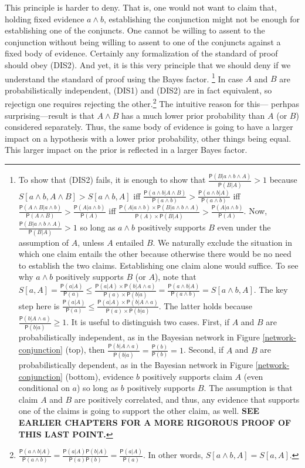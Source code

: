 \documentclass[10pt,dvipsnames,enabledeprecatedfontcommands]{scrartcl}
\newcommand{\pr}[1]{\mathsf{P}(#1)}
\begin{document}
\noindent This principle is harder to deny. That is, one would not want
to claim that, holding fixed evidence \(a\wedge b\), establishing the
conjunction might not be enough for establishing one of the conjuncts.
One cannot be willing to assent to the conjunction without being willing
to assent to one of the conjuncts against a fixed body of evidence.
Certainly any formalization of the standard of proof should obey (DIS2).
And yet, it is this very principle that we should deny if we understand
the standard of proof using the Bayes factor.
\footnote{To show that (DIS2) fails, it is enough to show that $\frac{\pr{B \vert a\wedge b \wedge A}}{\pr{B \vert A}}>1$ because $S[a\wedge b, A\wedge B]>S[a\wedge b, A]$ iff $\frac{\pr{a\wedge b \vert A \wedge B}}{\pr{a\wedge b}}>\frac{\pr{a\wedge b \vert A}}{\pr{a\wedge b}}$ iff $\frac{\pr{A\wedge B \vert a \wedge b}}{\pr{A\wedge B}}>\frac{\pr{A \vert a \wedge b }}{\pr{A}}$ iff $\frac{\pr{A \vert a \wedge b} \times \pr{B \vert a\wedge b\wedge A}}{\pr{A} \times \pr{B \vert A}}>\frac{\pr{A \vert a \wedge b }}{\pr{A}}$. Now, $\frac{\pr{B \vert a\wedge b \wedge A}}{\pr{B \vert A}}>1$ so long as $a\wedge b$ positively supports $B$ even under the assumption of $A$, unless $A$ entailed $B$. We naturally exclude the situation in which one claim entails the other because otherwise there would be no need to establish the two claims. Establishing one claim alone would suffice. To see why $a\wedge b$ positively supports $B$ (or $A$), note that $S[a, A]=\frac{\pr{a |A}}{\pr{a}} \leq \frac{\pr{a |A} \times \pr{b | A \wedge a}}{\pr{a}\times \pr{b | a}}=\frac{\pr{a \wedge b |A}}{\pr{a\wedge b}}=S[a \wedge b, A]$. The key step here is $\frac{\pr{a |A}}{\pr{a}} \leq \frac{\pr{a |A} \times \pr{b | A \wedge a}}{\pr{a}\times \pr{b | a}}$. The latter holds because $\frac{\pr{b | A \wedge a}}{\pr{b | a}}\geq 1$. It is useful to distinguish two cases. First, if $A$ and $B$ are probabilistically independent, as in the Bayesian network in Figure \ref{network-conjunction} (top), then $\frac{\pr{b | A \wedge a}}{\pr{b | a}}= \frac{\pr{b}}{\pr{b}} = 1$. Second, if $A$ and $B$ are probabilistically dependent, as in the Bayesian network in Figure \ref{network-conjunction} (bottom), evidence $b$ positively supports claim $A$ (even conditional on $a$) so long as $b$ positively supports $B$. The assumption is that claim $A$ and $B$ are positively correlated, and thus, any evidence that supports one of the claims is going to support the other claim, as well. \textbf{SEE EARLIER CHAPTERS FOR A MORE RIGOROUS PROOF OF THIS LAST POINT.}}
In case \(A\) and \(B\) are probabilistically independent, (DIS1) and
(DIS2) are in fact equivalent, so rejectign one requires rejecting the
other.\footnote{$\frac{\pr{a\wedge b \vert A}}{\pr{a\wedge b}}=\frac{\pr{a \vert A}\pr{b \vert A}}{\pr{a}\pr{b}}=\frac{\pr{a \vert A}}{\pr{a}}$. In other words, $S[a \wedge b, A]=S[a, A]$.}
The intuitive reason for this--- perhpas surprising---result is that
\(A \wedge B\) has a much lower prior probability than \(A\) (or \(B\))
considered separately. Thus, the same body of evidence is going to have
a larger impact on a hypothesis with a lower prior probability, other
things being equal. This larger impact on the prior is reflected in a
larger Bayes factor.
\end{document}
